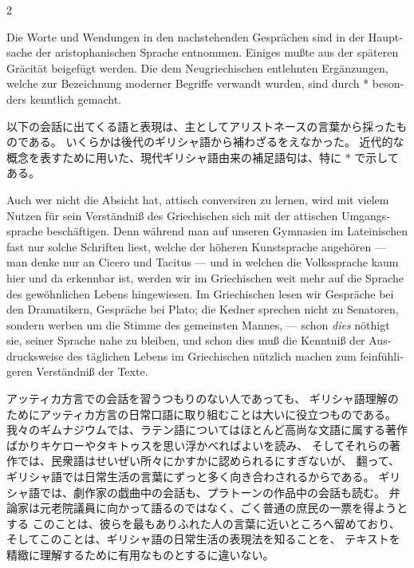 \begin{paracol}{2}
\begin{german}
Die Worte und Wendungen in den nachstehenden Gesprächen sind in der
Hauptsache der aristophanischen Sprache entnommen. Einiges mußte aus
der späteren Gräcität beigefügt werden. Die dem Neugriechischen entlehnten
Ergänzungen, welche zur Bezeichnung moderner Begriffe verwandt wurden,
sind durch {*} besonders kenntlich gemacht.
\end{german}
\switchcolumn

\begin{japanese}
以下の会話に出てくる語と表現は、主としてアリストネースの言葉から採ったものである。
いくらかは後代のギリシャ語から補わざるをえなかった。
近代的な概念を表すために用いた、現代ギリシャ語由来の補足語句は、特に {*} で示してある。
\end{japanese}
\switchcolumn*

\begin{german}
Auch wer nicht die Absicht hat, attisch conversiren zu lernen, wird
mit vielem Nutzen für sein Verständniß des Griechischen sich mit der
attischen Umgangssprache beschäftigen. Denn während
man auf unseren Gymnasien im Lateinischen fast nur solche Schriften
liest, welche der höheren Kunstsprache angehören
--- man denke nur an Cicero und Tacitus --- und in welchen die Volkssprache
kaum hier und da erkennbar ist, werden wir im
Griechischen weit mehr auf die Sprache des gewöhnlichen Lebens hingewiesen.
Im Griechischen lesen wir Gespräche bei den Dramatikern, Gespräche
bei Plato; die Kedner sprechen nicht zu Senatoren, sondern werben um die Stimme
des gemeinsten Mannes, --- schon \emph{dies}
nöthigt sie, seiner Sprache nahe zu bleiben, und schon dies muß die
Kenntniß der Ausdrucksweise
des täglichen Lebens im Griechischen nützlich machen zum feinfühligeren
Verständniß der Texte.
\end{german}
\switchcolumn

\begin{japanese}
アッティカ方言での会話を習うつもりのない人であっても、
ギリシャ語理解のためにアッティカ方言の日常口語に取り組むことは大いに役立つものである。
我々のギムナジウムでは、ラテン語についてはほとんど高尚な文語に属する著作ばかり\—{}キケローやタキトゥスを思い浮かべればよい\—{}を読み、
そしてそれらの著作では、民衆語はせいぜい所々にかすかに認められるにすぎないが、
翻って、ギリシャ語では日常生活の言葉にずっと多く向き合わされるからである。
ギリシャ語では、劇作家の戯曲中の会話も、プラトーンの作品中の会話も読む。
弁論家は元老院議員に向かって語るのではなく、ごく普通の庶民の一票を得ようとする\—{}
このことは、彼らを最もありふれた人の言葉に近いところへ留めており、
そしてこのことは、ギリシャ語の日常生活の表現法を知ることを、
テキストを精緻に理解するために有用なものとするに違いない。
\end{japanese}
\switchcolumn*


\end{paracol}
